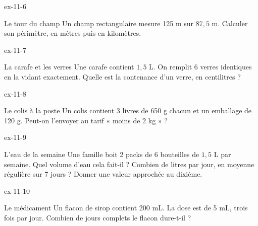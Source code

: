 \begin{blocLivre}{ex-11-6}\begin{exercice}[2]{Le tour du champ}
Un champ rectangulaire mesure 125 m sur $87{,}5$ m. Calculer son périmètre, en mètres puis en kilomètres.
\end{exercice}\end{blocLivre}
\begin{blocLivre}{ex-11-7}\begin{exercice}[2]{La carafe et les verres}
Une carafe contient $1{,}5$ L. On remplit 6 verres identiques en la vidant exactement. Quelle est la contenance d’un verre, en centilitres ?
\end{exercice}\end{blocLivre}
\begin{blocLivre}{ex-11-8}\begin{exercice}[2]{Le colis à la poste}
Un colis contient 3 livres de 650 g chacun et un emballage de 120 g. Peut-on l’envoyer au tarif « moins de 2 kg » ?
\end{exercice}\end{blocLivre}
\begin{blocLivre}{ex-11-9}\begin{exercice}[2]{L’eau de la semaine}
Une famille boit 2 packs de 6 bouteilles de $1{,}5$ L par semaine. Quel volume d’eau cela fait-il ? Combien de litres par jour, en moyenne régulière sur 7 jours ? Donner une valeur approchée au dixième.
\end{exercice}\end{blocLivre}
\begin{blocLivre}{ex-11-10}\begin{exercice}[2]{Le médicament}
Un flacon de sirop contient 200 mL. La dose est de 5 mL, trois fois par jour. Combien de jours complets le flacon dure-t-il ?
\end{exercice}\end{blocLivre}

